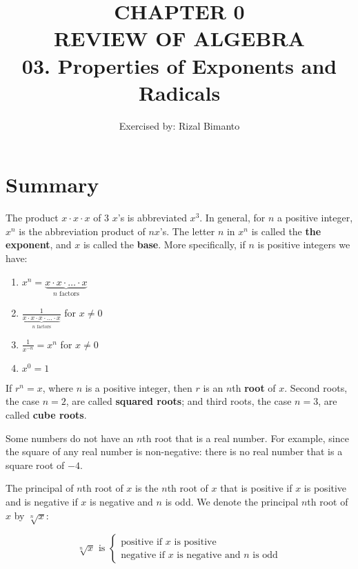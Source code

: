 \documentclass{article}
\title{CHAPTER 0\\
REVIEW OF ALGEBRA\\
03. Properties of Exponents and Radicals
}
\author{Exercised by: Rizal Bimanto}
\date{}
\begin{document}
\maketitle

\section{Summary}\par
\begin{onehalfspace}
    The product $x \cdot x \cdot x$ of 3 $x$'s is abbreviated $x^{3}$.
    In general, for $n$ a positive integer, $x^{n}$ is the abbreviation product
    of $n x$'s. The letter $n$ in $x^{n}$ is called the \textbf{the exponent},
    and $x$ is called the \textbf{base}. More specifically, if $n$ is positive integers we have:

    \begin{enumerate}
        \item $x^n = \underbrace{x \cdot x \cdot \ldots \cdot x} _ {n \text{ factors}}$
        \item $\frac {1}{\underbrace{x \cdot x \cdot x \cdot \ldots \cdot x}_{n \text{ factors}}}$ for $x \neq 0$
        \item $\frac {1}{x^{-n}} = x^{n}$ for $x \neq 0$
        \item $x^{0} = 1$
    \end{enumerate}

    If $r^{n} = x$, where $n$ is a positive integer, then $r$ is an $n$th \textbf{root} of $x$.
    Second roots, the case $n = 2$, are called \textbf{squared roots};
    and third roots, the case $n = 3$, are called \textbf{cube roots}.

    Some numbers do not have an $n$th root that is a real number.
    For example, since the square of any real number is non-negative:
    there is no real number that is a square root of $-4$.

    The principal of $n$th root of $x$ is the $n$th root of $x$
    that is positive if $x$ is positive and is negative if $x$ is negative
    and $n$ is odd. We denote the principal $n$th root of
    $x$ by $\sqrt[n]{x}$:

    \begin{center}
    \[
    \sqrt[n]{x} \text{ is }
        \begin{cases} 
        \text{positive if } x \text{ is positive} \\
        \text{negative if } x \text{ is negative and } n \text{ is odd}
        \end{cases}
    \]
    \end{center}


\end{onehalfspace}
\end{document}
